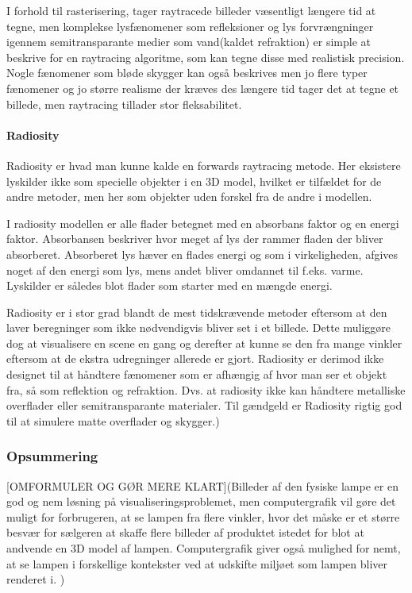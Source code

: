I forhold til rasterisering, tager raytracede billeder væsentligt længere tid at tegne, men komplekse lysfænomener som refleksioner og lys forvrængninger igennem semitransparante medier som vand(kaldet refraktion) er simple at beskrive for en raytracing algoritme, som kan tegne disse med realistisk precision. Nogle fænomener som bløde skygger kan også beskrives men jo flere typer fænomener og jo større realisme der kræves des længere tid tager det at tegne et billede, men raytracing tillader stor fleksabilitet.

\paragraph{Radiosity \cite{radiosity_by_wpi,radiosity_by_uob}}
Radiosity er hvad man kunne kalde en forwards raytracing metode. Her eksistere lyskilder ikke som specielle objekter i en 3D model, hvilket er tilfældet for de andre metoder, men her som objekter uden forskel fra de andre i modellen.

I radiosity modellen er alle flader betegnet med en absorbans faktor og en energi faktor. Absorbansen beskriver hvor meget af lys der rammer fladen der bliver absorberet. Absorberet lys hæver en flades energi og som i virkeligheden, afgives noget af den energi som lys, mens andet bliver omdannet til f.eks. varme. Lyskilder er således blot flader som starter med en mængde energi.

Radiosity er i stor grad blandt de mest tidskrævende metoder eftersom at den laver beregninger som ikke nødvendigvis bliver set i et billede. Dette muliggøre dog at visualisere en scene en gang og derefter at kunne se den fra mange vinkler eftersom at de ekstra udregninger allerede er gjort. Radiosity er derimod ikke designet til at håndtere fænomener som er afhængig af hvor man ser et objekt fra, så som reflektion og refraktion. Dvs. at radiosity ikke kan håndtere metalliske overflader eller semitransparante materialer. Til gændgeld er Radiosity rigtig god til at simulere matte overflader og skygger.)

\subsubsection*{Opsummering}
[OMFORMULER OG GØR MERE KLART](Billeder af den fysiske lampe er en god og nem løsning på visualiseringsproblemet, men computergrafik vil gøre det muligt for forbrugeren, at se lampen fra flere vinkler, hvor det måske er et større besvær for sælgeren at skaffe flere billeder af produktet istedet for blot at andvende en 3D model af lampen. Computergrafik giver også mulighed for nemt, at se lampen i forskellige kontekster ved at udskifte miljøet som lampen bliver renderet i. )

